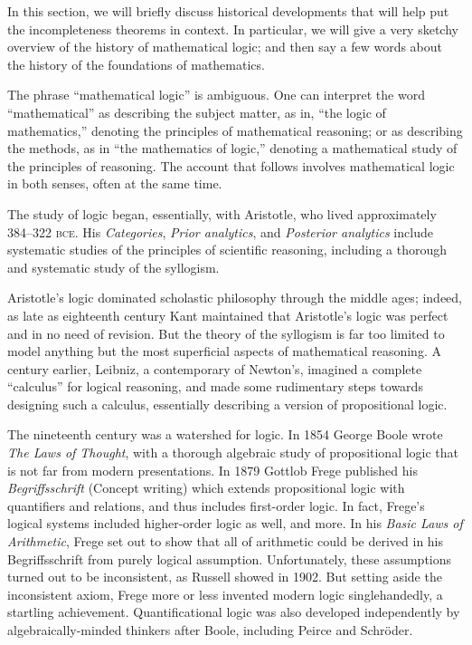 \documentclass[../../../include/open-logic-section]{subfiles}
\begin{document}


In this section, we will briefly discuss historical developments that
will help put the incompleteness theorems in context. In particular,
we will give a very sketchy overview of the history of mathematical
logic; and then say a few words about the history of the foundations
of mathematics.

\begin{digress}
  The phrase ``mathematical logic'' is ambiguous. One can interpret the
word ``mathematical'' as describing the subject matter, as in, ``the
logic of mathematics,'' denoting the principles of mathematical
reasoning; or as describing the methods, as in ``the mathematics of
logic,'' denoting a mathematical study of the principles of reasoning.
The account that follows involves mathematical logic in both senses,
often at the same time.
\end{digress}

The study of logic began, essentially, with Aristotle, who lived
approximately 384--322 \textsc{bce}. His \emph{Categories}, \emph{Prior
  analytics}, and \emph{Posterior analytics} include systematic
studies of the principles of scientific reasoning, including a
thorough and systematic study of the syllogism.

Aristotle's logic dominated scholastic philosophy through the middle
ages; indeed, as late as eighteenth century Kant maintained that
Aristotle's logic was perfect and in no need of revision. But the
theory of the syllogism is far too limited to model anything but
the most superficial aspects of mathematical reasoning. A century
earlier, Leibniz, a contemporary of Newton's, imagined a complete
``calculus'' for logical reasoning, and made some rudimentary steps
towards designing such a calculus, essentially describing a version of
propositional logic.

The nineteenth century was a watershed for logic. In 1854 George Boole
wrote \emph{The Laws of Thought}, with a thorough algebraic study of
propositional logic that is not far from modern presentations. In 1879
Gottlob Frege published his \emph{Begriffsschrift} (Concept writing)
which extends propositional logic with quantifiers and relations, and
thus includes first-order logic. In fact, Frege's logical systems
included higher-order logic as well, and more. In his \emph{Basic Laws
  of Arithmetic}, Frege set out to show that all of arithmetic could
be derived in his Begriffsschrift from purely logical
assumption. Unfortunately, these assumptions turned out to be
inconsistent, as Russell showed in 1902. But setting aside the
inconsistent axiom, Frege more or less invented modern logic
singlehandedly, a startling achievement. Quantificational logic was
also developed independently by algebraically-minded thinkers after
Boole, including Peirce and Schr\"oder.
\end{document}
